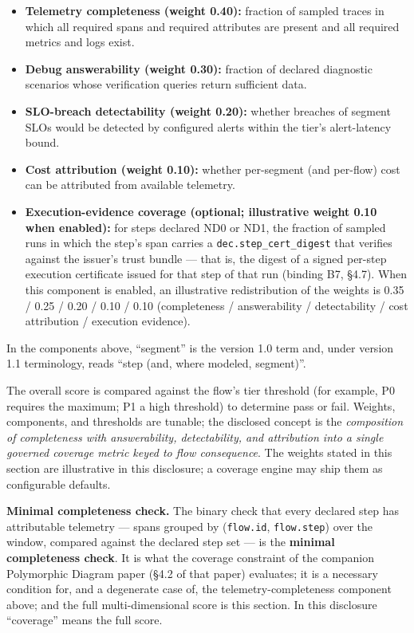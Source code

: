 \documentclass[11pt]{article}
\newcommand{\code}[1]{\texttt{#1}}
\begin{document}
\begin{itemize}
\item \textbf{Telemetry completeness (weight 0.40):} fraction of sampled traces in which all required spans and required attributes are present and all required metrics and logs exist.
\item \textbf{Debug answerability (weight 0.30):} fraction of declared diagnostic scenarios whose verification queries return sufficient data.
\item \textbf{SLO-breach detectability (weight 0.20):} whether breaches of segment SLOs would be detected by configured alerts within the tier's alert-latency bound.
\item \textbf{Cost attribution (weight 0.10):} whether per-segment (and per-flow) cost can be attributed from available telemetry.
\item \textbf{Execution-evidence coverage (optional; illustrative weight 0.10 when enabled):} for steps declared ND0 or ND1, the fraction of sampled runs in which the step's span carries a \code{dec.step\_cert\_digest} that verifies against the issuer's trust bundle --- that is, the digest of a signed per-step execution certificate issued for that step of that run (binding B7, \S4.7). When this component is enabled, an illustrative redistribution of the weights is 0.35 / 0.25 / 0.20 / 0.10 / 0.10 (completeness / answerability / detectability / cost attribution / execution evidence).
\end{itemize}

In the components above, ``segment'' is the version 1.0 term and, under version 1.1 terminology, reads ``step (and, where modeled, segment)''.

The overall score is compared against the flow's tier threshold (for example, P0 requires the maximum; P1 a high threshold) to determine pass or fail. Weights, components, and thresholds are tunable; the disclosed concept is the \emph{composition of completeness with answerability, detectability, and attribution into a single governed coverage metric keyed to flow consequence}. The weights stated in this section are illustrative in this disclosure; a coverage engine may ship them as configurable defaults.

\textbf{Minimal completeness check.} The binary check that every declared step has attributable telemetry --- spans grouped by (\code{flow.id}, \code{flow.step}) over the window, compared against the declared step set --- is the \textbf{minimal completeness check}. It is what the coverage constraint of the companion Polymorphic Diagram paper (\S4.2 of that paper) evaluates; it is a necessary condition for, and a degenerate case of, the telemetry-completeness component above; and the full multi-dimensional score is this section. In this disclosure ``coverage'' means the full score.
\end{document}
